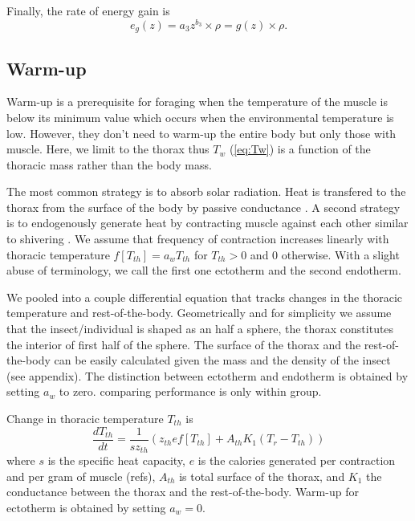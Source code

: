 Finally, the rate of energy gain is  
\begin{equation} \label{eq:eg}
	e_g(z) = a_3 z^{b_3} \times \rho  = g(z) \times \rho.
\end{equation}

\subsection*{Warm-up}
Warm-up is a prerequisite for foraging when the temperature of the muscle is below its minimum value which occurs when the environmental temperature is low. 
However, they don't need to warm-up the entire body but only those with muscle. 
Here, we limit to the thorax thus  $T_w$ (\cref{eq:Tw}) is a function of the thoracic mass rather than the body mass.

The most common strategy is to absorb solar radiation.
Heat is transfered to the thorax from the surface of the body by passive conductance \citep{Bakken1976}.
A second strategy is to endogenously generate heat by contracting muscle against each other similar to shivering \citep[e.g.,][]{Kammer1974}.
We assume that frequency of contraction increases linearly with thoracic temperature $f[T_{th}]  = a_w T_{th}$ for $T_{th}> 0$ and 0 otherwise.
With a slight abuse of terminology, we call the first one  ectotherm and the second  endotherm. %


We pooled into a couple differential equation that tracks changes in the thoracic temperature and rest-of-the-body.
Geometrically and for simplicity we  assume that the insect/individual is shaped as an half a sphere, the thorax constitutes the interior of first half of the sphere.
The surface of the thorax and the rest-of-the-body can be easily calculated given the mass and the density of the insect (see appendix).
The distinction between ectotherm and endotherm is obtained by setting $a_w$ to zero.
comparing performance is only within group.

Change in thoracic temperature $T_{th}$ is 
\begin{equation} \label{eq:dTh}
	\frac{dT_{th}}{dt} = \frac{1}{s z_{th}} (z_{th} e f[T_{th}] +  A_{th} K_1(T_r - T_{th}))
\end{equation}
where $s$ is the specific heat capacity, $e$ is the calories generated per contraction and per gram of muscle (refs), $A_{th}$ is total surface of the thorax, and $K_1$ the conductance between the thorax and the rest-of-the-body.
Warm-up for ectotherm is obtained by setting $a_w = 0$.

